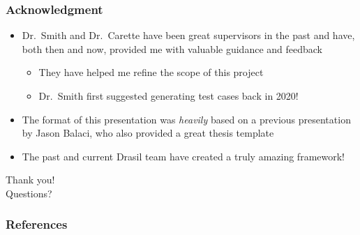 \documentclass{beamer}
\begin{document}



\begin{frame}
    \frametitle{Acknowledgment}

    \begin{itemize}
        \item Dr.~Smith and Dr.~Carette have been great supervisors in the
              past and have, both then and now, provided me with valuable guidance
              and feedback
              \begin{itemize}
                  \item They have helped me refine the scope of this project
                  \item Dr.~Smith first suggested generating test cases back in 2020!
              \end{itemize}
        \item<2-> The format of this presentation was \emph{heavily} based on
              a previous presentation by Jason Balaci, who also provided a
              great thesis template
        \item<3-> The past and current Drasil team have created a truly amazing
              framework!
    \end{itemize}
\end{frame}


\begin{frame}
    \center
    \huge{Thank you!}\\
    \normalsize{Questions?}
\end{frame}



\begin{frame}
    \frametitle{References}

    
\end{frame}
\end{document}
